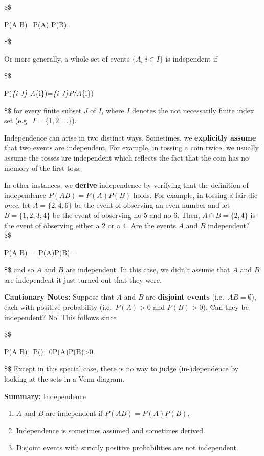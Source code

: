 \documentclass[
  letterpaper,
  DIV=11,
  numbers=noendperiod]{scrreprt}
\providecommand{\tightlist}{%
  \setlength{\itemsep}{0pt}\setlength{\parskip}{0pt}}\usepackage{longtable,booktabs,array}
\theoremstyle{definition}
\theoremstyle{plain}
\theoremstyle{plain}
\theoremstyle{remark}
\begin{document}
\$\$

P(A B)=P(A) P(B).

\$\$

Or more generally, a whole set of events \(\{A_i|i\in I\}\) is
independent if

\$\$

P\left(\bigcap\emph{\{i \in J\} A}\{i\}\right)=\prod\emph{\{i
\in J\}P\left(A}\{i\}\right)

\$\$ for every finite subset \(J\) of \(I\), where \(I\) denotes the not
necessarily finite index set (e.g.~\(I=\{1,2,\dots\}\)).

\bigskip

Independence can arise in two distinct ways. Sometimes, we
\textbf{explicitly assume} that two events are independent. For example,
in tossing a coin twice, we usually assume the tosses are independent
which reflects the fact that the coin has no memory of the first toss.

In other instances, we \textbf{derive} independence by verifying that
the definition of independence \(P(A B)=P(A)P(B)\) holds. For example,
in tossing a fair die \textit{once}, let \(A=\{2,4,6\}\) be the event of
observing an even number and let \(B=\{1,2,3,4\}\) be the event of
observing no \(5\) and no \(6\). Then, \(A \cap B=\{2,4\}\) is the event
of observing either a \(2\) or a \(4\). Are the events \(A\) and \(B\)
independent?\\
\$\$

P(A B)==P(A)P(B)=\cdot {}

\$\$ and so \(A\) and \(B\) are independent. In this case, we didn't
assume that \(A\) and \(B\) are independent it just turned out that they
were.

\textbf{Cautionary Notes:} Suppose that \(A\) and \(B\) are
\textbf{disjoint events} (i.e.~\(AB=\emptyset\)), each with positive
probability (i.e.~\(P(A)>0\) and \(P(B)>0\)). Can they be independent?
No! This follows since

\$\$

P(A B)=P(\emptyset)=0\neq P(A)P(B)\textgreater0.

\$\$ Except in this special case, there is no way to judge
(in-)dependence by looking at the sets in a Venn diagram.

\textbf{Summary:} Independence

\begin{enumerate}
\def\labelenumi{\arabic{enumi}.}
\tightlist
\item
  \(A\) and \(B\) are independent if \(P(A B)=P(A) P(B)\).
\item
  Independence is sometimes assumed and sometimes derived.
\item
  Disjoint events with strictly positive probabilities are not
  independent.
\end{enumerate}
\end{document}
